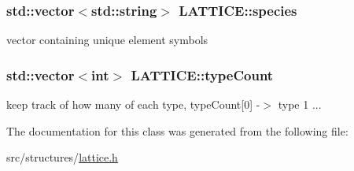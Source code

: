 \subsubsection[{species}]{\setlength{\rightskip}{0pt plus 5cm}std\+::vector$<$std\+::string$>$ L\+A\+T\+T\+I\+C\+E\+::species}\label{class_l_a_t_t_i_c_e_a3737ca172950824ad0ab699802f26417}


vector containing unique element symbols 

\hypertarget{class_l_a_t_t_i_c_e_aff3f0cdf099776c7c3dc5257e38aa52f}{}
\subsubsection[{type\+Count}]{\setlength{\rightskip}{0pt plus 5cm}std\+::vector$<$int$>$ L\+A\+T\+T\+I\+C\+E\+::type\+Count}\label{class_l_a_t_t_i_c_e_aff3f0cdf099776c7c3dc5257e38aa52f}


keep track of how many of each type, {\ttfamily type\+Count\mbox{[}0\mbox{]} -\/$>$ type 1 ...} 



The documentation for this class was generated from the following file\+:\begin{DoxyCompactItemize}
\item 
src/structures/\hyperlink{lattice_8h}{lattice.\+h}\end{DoxyCompactItemize}
